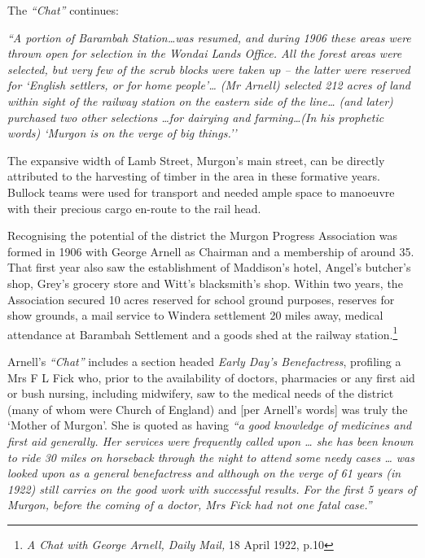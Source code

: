 The \emph{``Chat''} continues:



\emph{``A portion of Barambah Station\ldots was resumed, and during 1906 these areas were thrown open for selection in the Wondai Lands Office. All the forest areas were selected, but very few of the scrub blocks were taken up -- the latter were reserved for `English settlers, or for home people'\ldots{} (Mr Arnell) selected 212 acres of land within sight of the railway station on the eastern side of the line\ldots{} (and later) purchased two other selections \ldots for dairying and farming\ldots(In his prophetic words) `Murgon is on the verge of big things.''}



\smallskip


The expansive width of Lamb Street, Murgon's main street, can be directly attributed to the harvesting of timber in the area in these formative years. Bullock teams were used for transport and needed ample space to manoeuvre with their precious cargo en-route to the rail head.



Recognising the potential of the district the Murgon Progress Association was formed in 1906 with George Arnell as Chairman and a membership of around 35. That first year also saw the establishment of Maddison's hotel, Angel's butcher's shop, Grey's grocery store and Witt's blacksmith's shop. Within two years, the Association secured 10 acres reserved for school ground purposes, reserves for show grounds, a mail service to Windera settlement 20 miles away, medical attendance at Barambah Settlement and a goods shed at the railway station.\footnote{\emph{A Chat with George Arnell, Daily Mail,} 18 April 1922, p.10}


Arnell's \emph{``Chat''} includes a section headed \emph{Early Day's Benefactress}, profiling a Mrs F L Fick who, prior to the availability of doctors, pharmacies or any first aid or bush nursing, including midwifery, saw to the medical needs of the district (many of whom were Church of England) and {[}per Arnell's words{]} was truly the `Mother of Murgon'. She is quoted as having \emph{``a good knowledge of medicines and first aid generally. Her services were frequently called upon \ldots{} she has been known to ride 30 miles on horseback through the night to attend some needy cases \ldots{} was looked upon as a general benefactress and although on the verge of 61 years (in 1922) still carries on the good work with successful results. For the first 5 years of Murgon, before the coming of a doctor, Mrs Fick had not one fatal case.''}



